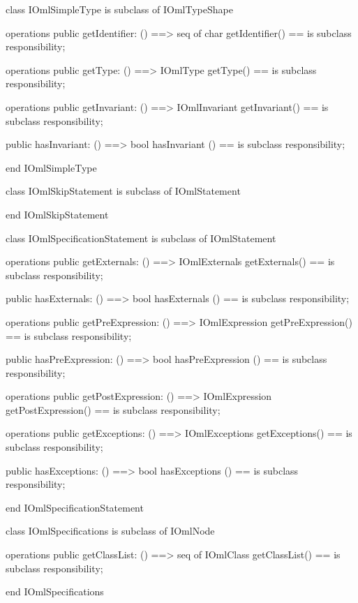 \begin{vdm_al}
class IOmlSimpleType
 is subclass of IOmlTypeShape

operations
  public getIdentifier: () ==> seq of char
  getIdentifier() == is subclass responsibility;

operations
  public getType: () ==> IOmlType
  getType() == is subclass responsibility;

operations
  public getInvariant: () ==> IOmlInvariant
  getInvariant() == is subclass responsibility;

  public hasInvariant: () ==> bool
  hasInvariant () == is subclass responsibility;

end IOmlSimpleType
\end{vdm_al}

\begin{vdm_al}
class IOmlSkipStatement
 is subclass of IOmlStatement

end IOmlSkipStatement
\end{vdm_al}

\begin{vdm_al}
class IOmlSpecificationStatement
 is subclass of IOmlStatement

operations
  public getExternals: () ==> IOmlExternals
  getExternals() == is subclass responsibility;

  public hasExternals: () ==> bool
  hasExternals () == is subclass responsibility;

operations
  public getPreExpression: () ==> IOmlExpression
  getPreExpression() == is subclass responsibility;

  public hasPreExpression: () ==> bool
  hasPreExpression () == is subclass responsibility;

operations
  public getPostExpression: () ==> IOmlExpression
  getPostExpression() == is subclass responsibility;

operations
  public getExceptions: () ==> IOmlExceptions
  getExceptions() == is subclass responsibility;

  public hasExceptions: () ==> bool
  hasExceptions () == is subclass responsibility;

end IOmlSpecificationStatement
\end{vdm_al}

\begin{vdm_al}
class IOmlSpecifications
 is subclass of IOmlNode

operations
  public getClassList: () ==> seq of IOmlClass
  getClassList() == is subclass responsibility;

end IOmlSpecifications
\end{vdm_al}

